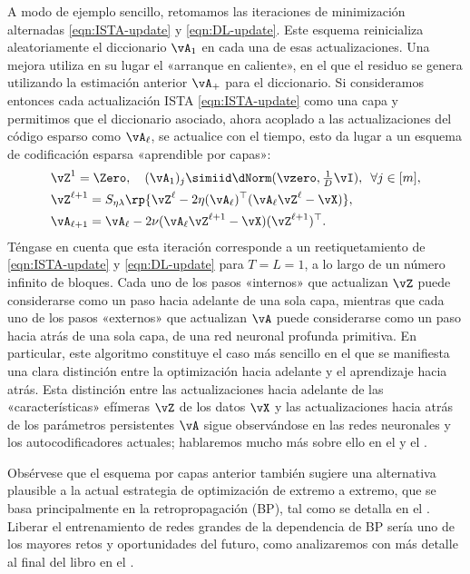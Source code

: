 \documentclass[../../book-main.tex]{subfiles}
\begin{document}
A modo de ejemplo sencillo, retomamos las iteraciones de minimización alternadas
\eqref{eqn:ISTA-update} y \eqref{eqn:DL-update}.
Este esquema reinicializa aleatoriamente el diccionario $\vA_1$ en cada una de esas actualizaciones.
Una mejora utiliza en su lugar el «arranque en caliente», en el que el residuo
se genera utilizando la estimación anterior $\vA_+$ para el diccionario.
Si consideramos entonces cada actualización ISTA \eqref{eqn:ISTA-update} como una capa y permitimos
que el diccionario asociado, ahora acoplado a las actualizaciones del código esparso como
$\vA_\ell$, se actualice con el tiempo, esto da lugar a un esquema de codificación esparsa
«aprendible por capas»:
\begin{align}
    & \vZ^{1}
    = \Zero, \quad (\vA_{1})_j
    \simiid \dNorm(\vzero, \tfrac{1}{D}\vI), \enspace \forall j \in [m], \\
    & \vZ^{\ell + 1} = S_{\eta\lambda}\rp{\vZ^{\ell}
        - 2\eta(\vA_{\ell})^\top(\vA_{\ell}\vZ^{\ell}
    - \vX)},\label{eq:ISTA-update-layerwise}\\
    & \vA_{\ell + 1} = \vA_{\ell}- 2\nu (\vA_{\ell}\vZ^{\ell + 1}
    - \vX)(\vZ^{\ell + 1})^\top.
\end{align}
Téngase en cuenta que esta iteración %
corresponde a un reetiquetamiento de \eqref{eqn:ISTA-update} y \eqref{eqn:DL-update}
para $T = L = 1$, a lo largo de un número infinito de bloques.
Cada uno de los pasos «internos» que actualizan $\vZ$ puede considerarse como un paso 
hacia adelante de una sola capa, mientras que cada uno de los pasos «externos» que 
actualizan $\vA$ puede considerarse como un paso hacia atrás de una sola capa, 
de una red neuronal profunda primitiva. En particular, este algoritmo constituye el 
caso más sencillo en el que se manifiesta una clara distinción entre
la optimización hacia adelante y el aprendizaje hacia atrás. Esta
distinción entre las actualizaciones hacia adelante de las «características» efímeras
$\vZ$ de los datos $\vX$ y las actualizaciones hacia atrás de los parámetros
persistentes $\vA$  sigue observándose en las redes neuronales y los
autocodificadores actuales; hablaremos mucho más sobre ello en
el  y el .

Obsérvese que el esquema por capas anterior también sugiere una alternativa plausible
a la actual estrategia de optimización de extremo a extremo, que
se basa principalmente en la retropropagación (BP), tal como se detalla en el
. Liberar el entrenamiento de redes grandes de la dependencia de BP sería
uno de los mayores retos y oportunidades del futuro, como
analizaremos con más detalle al final del libro en el .
\end{document}
